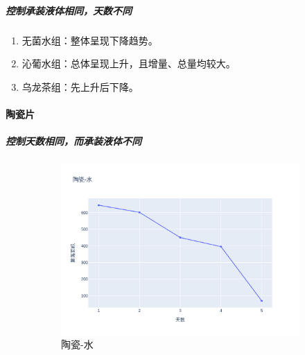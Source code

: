 \documentclass[12pt,a4paper]{ctexart}
\begin{document}
 
\subparagraph{控制承装液体相同，天数不同}
\begin{enumerate}
    \item 无菌水组：整体呈现下降趋势。
    \item 沁葡水组：总体呈现上升，且增量、总量均较大。
    \item 乌龙茶组：先上升后下降。
\end{enumerate}
 
\paragraph{陶瓷片}
\subparagraph{控制天数相同，而承装液体不同}
\begin{figure}[htbp]  %
    \centering  %
    \begin{subfigure}[b]{0.31\textwidth}  %
        \centering
        \includegraphics[width=\linewidth]{./plot/SingleMaterial/china/陶瓷-水_line.png}  %
        \caption{陶瓷-水}  %
        \label{subfig:1}     %
    \end{subfigure}
    \hfill  %
    \begin{subfigure}[b]{0.31\textwidth}
        \centering

\end{subfigure}
\end{figure}
\end{document}

